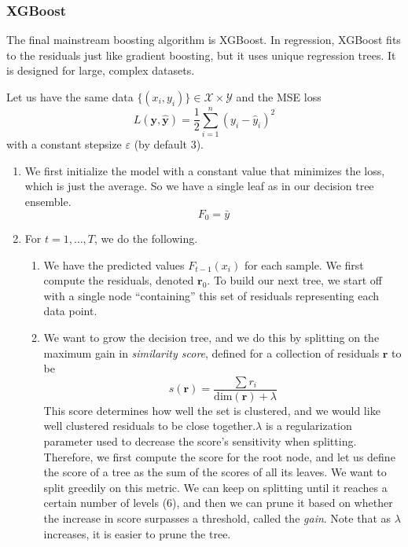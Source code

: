 \documentclass{article}
\begin{document}
      \subsubsection{XGBoost} 

        The final mainstream boosting algorithm is XGBoost. In regression, XGBoost fits to the residuals just like gradient boosting, but it uses unique regression trees. It is designed for large, complex datasets. 

        \begin{definition} 
          Let us have the same data $\{(x_i, y_i)\} \in \mathcal{X} \times \mathcal{Y}$ and the MSE loss 
          \begin{equation}
            L(\mathbf{y}, \hat{\mathbf{y}}) = \frac{1}{2} \sum_{i=1}^n (y_i - \hat{y}_i)^2
          \end{equation}
          with a constant stepsize $\varepsilon$ (by default $3$). 

          \begin{enumerate}
            \item We first initialize the model with a constant value that minimizes the loss, which is just the average. So we have a single leaf as in our decision tree ensemble. 
              \begin{equation}
                F_0 = \bar{y}
              \end{equation}

            \item For $t = 1, \ldots, T$, we do the following. 
              \begin{enumerate}
                \item We have the predicted values $F_{t-1}(x_i)$ for each sample. We first compute the residuals, denoted $\mathbf{r}_0$. To build our next tree, we start off with a single node ``containing'' this set of residuals representing each data point. 

                \item We want to grow the decision tree, and we do this by splitting on the maximum gain in \textit{similarity score}, defined for a collection of residuals $\mathbf{r}$ to be 
                \begin{equation}
                  s(\mathbf{r}) = \frac{\sum r_i}{\mathrm{dim}(\mathbf{r}) + \lambda}
                \end{equation}
                This score determines how well the set is clustered, and we would like well clustered residuals to be close together.$\lambda$ is a regularization parameter used to decrease the score's sensitivity when splitting. Therefore, we first compute the score for the root node, and let us define the score of a tree as the sum of the scores of all its leaves. We want to split greedily on this metric. We can keep on splitting until it reaches a certain number of levels (6), and then we can prune it based on whether the increase in score surpasses a threshold, called the \textit{gain}. Note that as $\lambda$ increases, it is easier to prune the tree. 


\end{enumerate}
\end{enumerate}
\end{definition}
\end{document}
